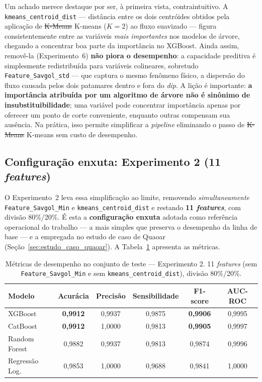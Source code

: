 \documentclass[msc]{on} %
\makeatletter
\providecommand{\DIFaddtex}[1]{{\protect\color{red}#1}} %
\providecommand{\DIFdeltex}[1]{{\protect\color{red}\sout{#1}}} %
\providecommand{\DIFaddbegin}{} %
\providecommand{\DIFaddend}{} %
\providecommand{\DIFdelbegin}{} %
\providecommand{\DIFdelend}{} %
\providecommand{\DIFadd}[1]{\texorpdfstring{\DIFaddtex{#1}}{#1}} %
\providecommand{\DIFdel}[1]{\texorpdfstring{\DIFdeltex{#1}}{}} %
\let\sout@orig\sout %
\renewcommand{\sout}[1]{\ifmmode\text{\sout@orig{\ensuremath{#1}}}\else\sout@orig{#1}\fi} %
\makeatother
\begin{document}
Um achado merece destaque por ser, à primeira vista, contraintuitivo. A \texttt{kmeans\_centroid\_dist} --- distância entre os dois centróides obtidos pela aplicação de \DIFdelbegin \DIFdel{K-Means }\DIFdelend \DIFaddbegin \DIFadd{K-means }\DIFaddend ($K=2$) ao fluxo suavizado --- figura consistentemente entre as variáveis \emph{mais importantes} nos modelos de árvore, chegando a concentrar boa parte da importância no XGBoost. Ainda assim, removê-la (Experimento~6) \textbf{não piora o desempenho}: a capacidade preditiva é simplesmente redistribuída para variáveis colineares, sobretudo \texttt{Feature\_Savgol\_std} --- que captura o mesmo fenômeno físico, a dispersão do fluxo causada pelos dois patamares dentro e fora do \textit{dip}. A lição é importante: \textbf{a importância atribuída por um algoritmo de árvore não é sinônimo de insubstituibilidade}; uma variável pode concentrar importância apenas por oferecer um ponto de corte conveniente, enquanto outras compensam sua ausência. Na prática, isso permite simplificar a \textit{pipeline} eliminando o passo de \DIFdelbegin \DIFdel{K-Means }\DIFdelend \DIFaddbegin \DIFadd{K-means }\DIFaddend sem custo de desempenho.

\subsection{Configuração enxuta: Experimento 2 (11 \textit{features})}
\label{sec:resultados_exp5}

O Experimento~2 leva essa simplificação ao limite, removendo \emph{simultaneamente} \texttt{Feature\_Savgol\_Min} e \texttt{kmeans\_centroid\_dist} e restando \textbf{11 \textit{features}}, com divisão 80\%/20\%. É esta a \textbf{configuração enxuta} adotada como referência operacional do trabalho --- a mais simples que preserva o desempenho da linha de base --- e a empregada no estudo de caso de Quaoar (Seção~\ref{sec:estudo_caso_quaoar}). A Tabela~\ref{tab:metricas_5} apresenta as métricas.

\begin{table}[htbp]
\centering
\caption{Métricas de desempenho no conjunto de teste --- Experimento 2. 11 \textit{features} (sem \texttt{Feature\_Savgol\_Min} e sem \texttt{kmeans\_centroid\_dist}), divisão 80\%/20\%.}
\label{tab:metricas_5}
\begin{tabular}{lccccc}
\hline
\textbf{Modelo} & \textbf{Acurácia} & \textbf{Precisão} & \textbf{Sensibilidade} & \textbf{F1-score} & \textbf{AUC-ROC} \\
\hline
XGBoost         & \textbf{0,9912} & 0,9937 & 0,9875 & \textbf{0,9906} & 0,9995 \\
CatBoost        & \textbf{0,9912} & 1,0000 & 0,9813 & \textbf{0,9905} & 0,9997 \\
Random Forest   & 0,9882 & 0,9937 & 0,9813 & 0,9874 & 0,9996 \\
Regressão Log.  & 0,9853 & 1,0000 & 0,9688 & 0,9841 & 1,0000 \\
\hline
\end{tabular}
\end{table}
\end{document}
